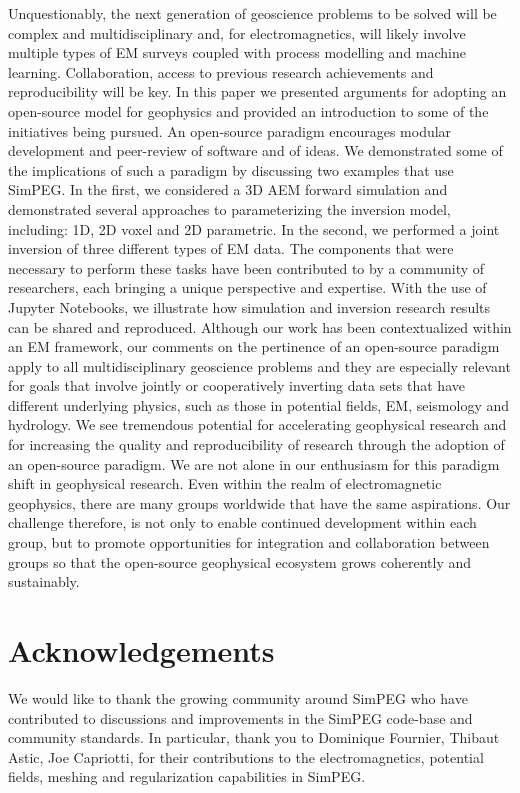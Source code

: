 \documentclass[paper]{geophysics}
\begin{document}
Unquestionably, the next generation of geoscience problems to be solved will be complex and multidisciplinary and, for electromagnetics, will likely involve multiple types of EM surveys coupled with process modelling and machine learning. Collaboration, access to previous research achievements and reproducibility will be key. In this paper we presented arguments for adopting an open-source model for geophysics and provided an introduction to some of the initiatives being pursued. An open-source paradigm encourages modular development and peer-review of software and of ideas. We demonstrated some of the implications of such a paradigm by discussing two examples that use SimPEG. In the first, we considered a 3D AEM forward simulation and demonstrated several approaches to parameterizing the inversion model, including: 1D, 2D voxel and 2D parametric. In the second, we performed a joint inversion of three different types of EM data. The components that were necessary to perform these tasks have been contributed to by a community of researchers, each bringing a unique perspective and expertise. With the use of Jupyter Notebooks, we illustrate how simulation and inversion research results can be shared and reproduced. Although our work has been contextualized within an EM framework, our comments on the pertinence of an open-source paradigm apply to all multidisciplinary geoscience problems and they are especially relevant for goals that involve jointly or cooperatively inverting data sets that have different underlying physics, such as those in potential fields, EM, seismology and hydrology. We see tremendous potential for accelerating geophysical research and for increasing the quality and reproducibility of research through the adoption of an open-source paradigm. We are not alone in our enthusiasm for this paradigm shift in geophysical research. Even within the realm of electromagnetic geophysics, there are many groups worldwide that have the same aspirations. Our challenge therefore, is not only to enable continued development within each group, but to promote opportunities for integration and collaboration between groups so that the open-source geophysical ecosystem grows coherently and sustainably.


\section{Acknowledgements}
We would like to thank the growing community around SimPEG who have contributed to discussions and improvements in the SimPEG code-base and community standards. In particular, thank you to Dominique Fournier, Thibaut Astic, Joe Capriotti, for their contributions to the electromagnetics, potential fields, meshing and regularization capabilities in SimPEG.





\end{document}
